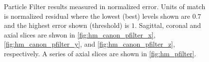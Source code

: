 \begin{figure}[H]
\centering
{}
\caption{Particle Filter results measured in normalized error.
        Units of match is normalized residual where the lowest (best) levels shown are
        $0.7$ and the highest error shown (threshold) is $1$.
        Sagittal, coronal and axial slices are shwon in \autoref{fig:hm_canon_pfilter_x},
        \autoref{fig:hm_canon_pfilter_y}, and
         \autoref{fig:hm_canon_pfilter_z}, respectively. A series of axial slices are shown in
         \autoref{fig:hm_pfilter}.  }
\label{fig:hm_canon_pfilter}
\end{figure}

